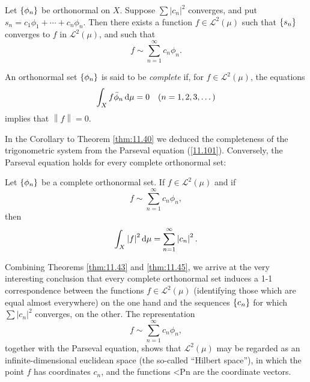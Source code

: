 \begin{thm}
    \label{thm:11.43}
    Let $\protect\{\phi_n\}$ be orthonormal on $X$. 
    Suppose $\sum \left| c_n \right|^2$ converges, 
    and put $s_n = c_1 \phi_1 + \cdots + c_n\phi_n$. 
    Then there exists a function $f \in \mathscr{L}^2(\mu)$
    such that $\protect\{s_n\}$ converges to $f$ in $\mathscr{L}^2(\mu)$, 
    and such that
    \begin{equation*}
        f \sim \sum_{n=1}^{\infty}c_n \phi_n .
    \end{equation*}
\end{thm}

\begin{mydef}
    \label{mydef:11.44}
    An orthonormal set $\protect\{\phi_n\}$ is said to be \emph{complete} if, for $f \in \mathscr{L}^2(\mu)$, the equations
    \begin{equation*}
        \int_X f \bar{\phi}_n \d \mu = 0
        \quad (n = 1,2,3,\dots)
    \end{equation*}
    implies that $\left\| f \right\| = 0$.
\end{mydef}


In the Corollary to Theorem \ref{thm:11.40} 
we deduced the completeness of the
trigonometric system from the Parseval equation (\ref{11.101}). 
Conversely, the Parseval
equation holds for every complete orthonormal set:

\begin{thm}
    \label{thm:11.45}
    Let $\protect\{\phi_n\}$ be a complete orthonormal set. 
    If $f \in \mathscr{L}^2(\mu)$ and if
    \begin{equation}
        \label{eq:11.106}
        f \sim \sum_{n=1}^{\infty} c_n \phi_n,
    \end{equation}
    then 
    \begin{equation}
        \label{eq:11.107}
        \int_X \left| f \right|^2 \d \mu =
        \sum_{n=1}^{\infty} \left| c_n \right|^2 .
    \end{equation}
\end{thm}


Combining Theorems \ref{thm:11.43} and \ref{thm:11.45}, we arrive at the very interesting
conclusion that every complete orthonormal set induces a 1-1 correspondence
between the functions $f \in \mathscr{L}^2(\mu)$ 
(identifying those which are equal almost everywhere)
on the one hand and the sequences $\protect\{c_n\}$ for which $\sum \left| c_n \right|^2$ converges,
on the other. The representation
\begin{equation*}
    f \sim \sum_{n=1}^{\infty} c_n \phi_n ,
\end{equation*}
together with the Parseval equation, shows that $\mathscr{L}^2(\mu)$ may be regarded as an
infinite-dimensional euclidean space (the so-called ``Hilbert space''), in which
the point $f$ has coordinates $c_n$, and the functions <Pn are the coordinate vectors.
